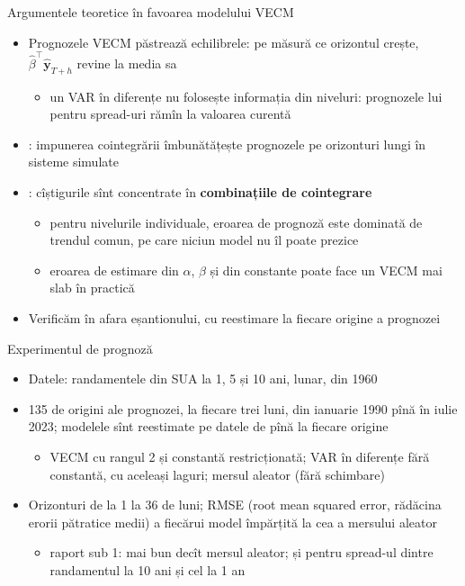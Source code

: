 \begin{frame}{Argumentele teoretice în favoarea modelului VECM}
\itemsize{\small}
\begin{itemize}
    \item Prognozele VECM păstrează echilibrele: pe măsură ce orizontul crește, $\hat\beta^\top\hat{\mathbf y}_{T+h}$ revine la media sa
    \begin{itemize}
        \item un VAR în diferențe nu folosește informația din niveluri: prognozele lui pentru spread-uri rămîn la valoarea curentă
    \end{itemize}
    \item {}: impunerea cointegrării îmbunătățește prognozele pe orizonturi lungi în sisteme simulate
    \item {}: cîștigurile sînt concentrate în \textbf{combinațiile de cointegrare}
    \begin{itemize}
        \item pentru nivelurile individuale, eroarea de prognoză este dominată de trendul comun, pe care niciun model nu îl poate prezice
        \item eroarea de estimare din $\alpha$, $\beta$ și din constante poate face un VECM mai slab în practică
    \end{itemize}
    \item Verificăm în afara eșantionului, cu reestimare la fiecare origine a prognozei
\end{itemize}
\end{frame}

\begin{frame}{Experimentul de prognoză}
\itemsize{\small}
\begin{itemize}
    \item Datele: randamentele din SUA la 1, 5 și 10 ani, lunar, din 1960
    \item 135 de origini ale prognozei, la fiecare trei luni, din ianuarie 1990 pînă în iulie 2023; modelele sînt reestimate pe datele de pînă la fiecare origine
    \begin{itemize}
        \item VECM cu rangul 2 și constantă restricționată; VAR în diferențe fără constantă, cu aceleași laguri; mersul aleator (fără schimbare)
    \end{itemize}
    \item Orizonturi de la 1 la 36 de luni; RMSE (root mean squared error, rădăcina erorii pătratice medii) a fiecărui model împărțită la cea a mersului aleator
    \begin{itemize}
        \item raport sub 1: mai bun decît mersul aleator; și pentru spread-ul dintre randamentul la 10 ani și cel la 1 an
    \end{itemize}
\end{itemize}
\end{frame}

